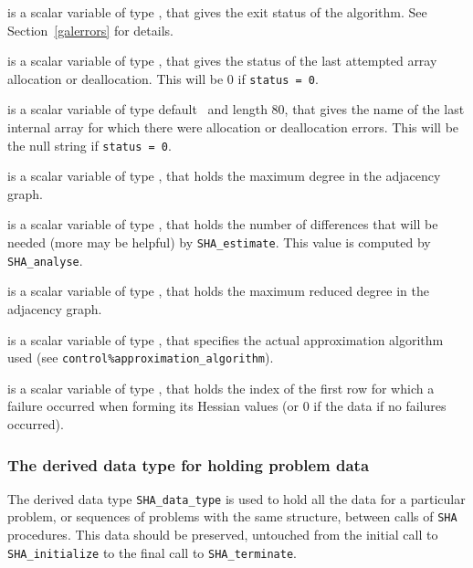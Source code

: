\documentclass{galahad}
\newcommand{\packagename}{SHA}
\begin{document}
\begin{description}
 is a scalar variable of type \integer, that gives the
exit status of the algorithm. 
See Section~\ref{galerrors} for details.

 is a scalar variable of type \integer, that gives
the status of the last attempted array allocation or deallocation.
This will be 0 if {\tt status = 0}.

 is a scalar variable of type default \character\
and length 80, that  gives the name of the last internal array 
for which there were allocation or deallocation errors.
This will be the null string if {\tt status = 0}. 

 is a scalar variable of type \integer, 
that holds the maximum degree in the adjacency graph.

 is a scalar variable of type \integer, 
that holds the number of differences that will be needed (more may be helpful)
by {\tt \packagename\_\-estimate}. This value is computed by
{\tt \packagename\_\-analyse}.

 is a scalar variable of type \integer, 
that holds the maximum reduced degree in the adjacency graph.

  is a scalar variable of type 
\integer, that specifies the actual approximation algorithm used
(see {\tt control\%approximation\_algorithm}).

 is a scalar variable of type \integer, that holds the 
index of the first row for which a failure occurred when forming its Hessian
values (or 0 if the data if no failures occurred).

\end{description}


\subsubsection{The derived data type for holding problem data}\label{typedata}
The derived data type 
{\tt \packagename\_data\_type} 
is used to hold all the data for a particular problem,
or sequences of problems with the same structure, between calls of 
{\tt \packagename} procedures. 
This data should be preserved, untouched from the initial call to 
{\tt \packagename\_initialize}
to the final call to
{\tt \packagename\_terminate}.
\end{document}
